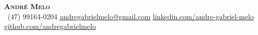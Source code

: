 \begin{center}
    \textbf{\Huge \scshape André Melo} \\ \vspace{1pt}
     \ \footnotesize (47) 99164-0204 \quad
    \href{mailto:andregabrielmelo@gmail.com}{ \underline{andregabrielmelo@gmail.com}} \quad
    \href{https://www.linkedin.com/in/andre-gabriel-melo/}{ \underline{linkedin.com/andre-gabriel-melo}} \quad
    \href{https://github.com/andregabrielmelo}{ \underline{github.com/andregabrielmelo}}
\end{center}